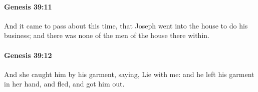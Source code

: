 		\paragraph{Genesis 39:11} %
			\label{GENESIS-39-11}

			And it came to pass about this time, that Joseph went into the house to do his business; and there was none of the men of the house there within.


		\paragraph{Genesis 39:12} %
			\label{GENESIS-39-12}

			And she caught him by his garment, saying, Lie with me: and he left his garment in her hand, and fled, and got him out.


